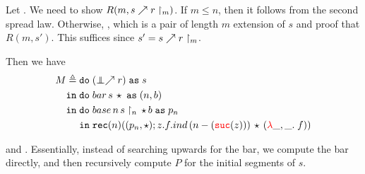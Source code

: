 Let . We need to show $R(m, s \nearrow r\restriction_m)$.
If $m \le n$, then it follows from the second spread law. 
Otherwise, , which is a pair of 
length $m$ extension of $s$ and proof that $R(m, s')$. 
This suffices since $s' = s \nearrow r\restriction_m$.

Then we have 
\begin{align*}
  M \triangleq \bind{&(\extSeq{\empseq}{r})}{s\\}{
    \bind{&bar\,s\,\triv}{(n,b)\\}{
    \bind{
      &base\,n\,s\restriction_n\,\triv\,b
    }{p_n\\}{
      &\rec{n}{(p_n,\triv)}{z}{f}{ind\,(n-(\suc{z}))\,\triv\,(\lam{\_,\_}{}{f})}
    }
  }
  }
\end{align*}

and . Essentially, instead of searching upwards for the bar, we compute 
the bar directly, and then recursively compute $P$ for the initial segments of $s$.
